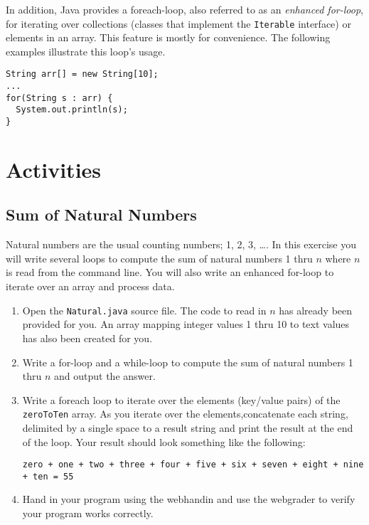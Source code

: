 \documentclass[12pt]{scrartcl}
\begin{document}
In addition, Java provides a foreach-loop, also referred to as an 
\emph{enhanced for-loop}, for iterating over collections (classes 
that implement the \texttt{Iterable} interface) or elements 
in an array.  This feature is mostly for convenience.  The following 
examples illustrate this loop's usage.

\begin{verbatim}
String arr[] = new String[10];
...
for(String s : arr) {
  System.out.println(s); 
}
\end{verbatim}

\section*{Activities}

\subsection*{Sum of Natural Numbers}

Natural numbers are the usual counting numbers; 1, 2, 3, \ldots.  In 
this exercise you will write several loops to compute the sum of 
natural numbers 1 thru $n$ where $n$ is read from the command line.  
You will also write an enhanced for-loop to iterate over an array and 
process data.

\begin{enumerate}
  \item Open the \texttt{Natural.java} source file.  The code 
	to read in $n$ has already been provided for you.  An array mapping 
	integer values 1 thru 10 to text values has also been created for you.
  \item Write a for-loop and a while-loop to compute the sum of natural 
  	numbers 1 thru $n$ and output the answer.
  \item Write a foreach loop to iterate over the elements (key/value pairs) 
	of the \texttt{zeroToTen} array.  As you iterate over the 
	elements,concatenate each string, delimited by a single space to a 
	result string and print the result at the end of the loop.  Your 
	result should look something like the following:
	
	\texttt{zero + one + two + three + four + five + six + seven + eight + nine + ten = 55}
  \item Hand in your program using the webhandin and use the webgrader
    to verify your program works correctly.
\end{enumerate}
\end{document}
